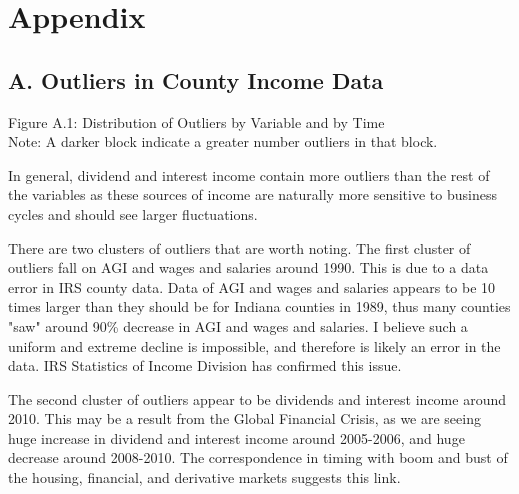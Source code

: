 \documentclass{article}
\begin{document}
\pagebreak

\section*{Appendix}

\subsection*{A. Outliers in County Income Data}

\begin{center}
Figure A.1: Distribution of Outliers by Variable and by Time\\
\noindent
{}
Note: A darker block indicate a greater number outliers in that block. 
\end{center}

In general, dividend and interest income contain more outliers than the rest of the variables as these sources of income are naturally more sensitive to business cycles and should see larger fluctuations. 

There are two clusters of outliers that are worth noting. The first cluster of outliers fall on AGI and wages and salaries around 1990. This is due to a data error in IRS county data. Data of AGI and wages and salaries appears to be 10 times larger than they should be for Indiana counties in 1989, thus many counties "saw" around 90\% decrease in AGI and wages and salaries. I believe such a uniform and extreme decline is impossible, and therefore is likely an error in the data. IRS Statistics of Income Division has confirmed this issue. 

The second cluster of outliers appear to be dividends and interest income around 2010. This may be a result from the Global Financial Crisis, as we are seeing huge increase in dividend and interest income around 2005-2006, and huge decrease around 2008-2010. The correspondence in timing with boom and bust of the housing, financial, and derivative markets suggests this link. 
\end{document}

